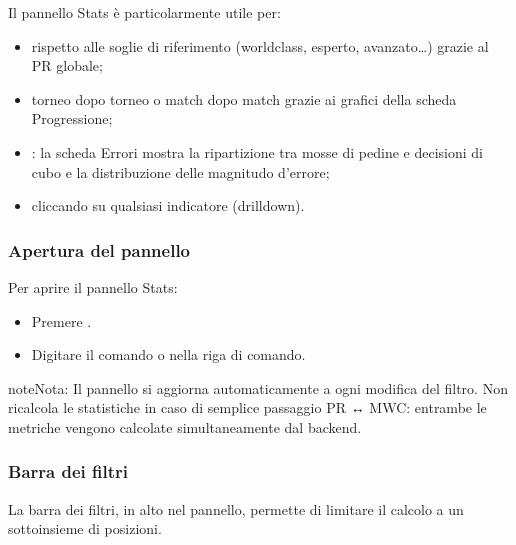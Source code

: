 \documentclass[letterpaper,10pt,italian]{sphinxmanual}
\begin{document}
\sphinxAtStartPar
Il pannello Stats è particolarmente utile per:
\begin{itemize}
\item {} 
\sphinxAtStartPar
{} rispetto alle soglie di riferimento (world\sphinxhyphen{}class, esperto, avanzato…) grazie al PR globale;

\item {} 
\sphinxAtStartPar
{} torneo dopo torneo o match dopo match grazie ai grafici della scheda Progressione;

\item {} 
\sphinxAtStartPar
{}: la scheda Errori mostra la ripartizione tra mosse di pedine e decisioni di cubo e la distribuzione delle magnitudo d’errore;

\item {} 
\sphinxAtStartPar
{} cliccando su qualsiasi indicatore (drill\sphinxhyphen{}down).

\end{itemize}


\subsubsection{Apertura del pannello}
\label{\detokenize{manuel:ouverture-du-panneau}}
\sphinxAtStartPar
Per aprire il pannello Stats:
\begin{itemize}
\item {} 
\sphinxAtStartPar
Premere .

\item {} 
\sphinxAtStartPar
Digitare il comando  o  nella riga di comando.

\end{itemize}

\begin{sphinxadmonition}{note}{Nota:}
\sphinxAtStartPar
Il pannello si aggiorna automaticamente a ogni modifica del filtro. Non ricalcola le statistiche in caso di semplice passaggio PR ↔ MWC: entrambe le metriche vengono calcolate simultaneamente dal backend.
\end{sphinxadmonition}


\subsubsection{Barra dei filtri}
\label{\detokenize{manuel:barre-de-filtre}}
\sphinxAtStartPar
La barra dei filtri, in alto nel pannello, permette di limitare il calcolo a un sottoinsieme di posizioni.
\end{document}
